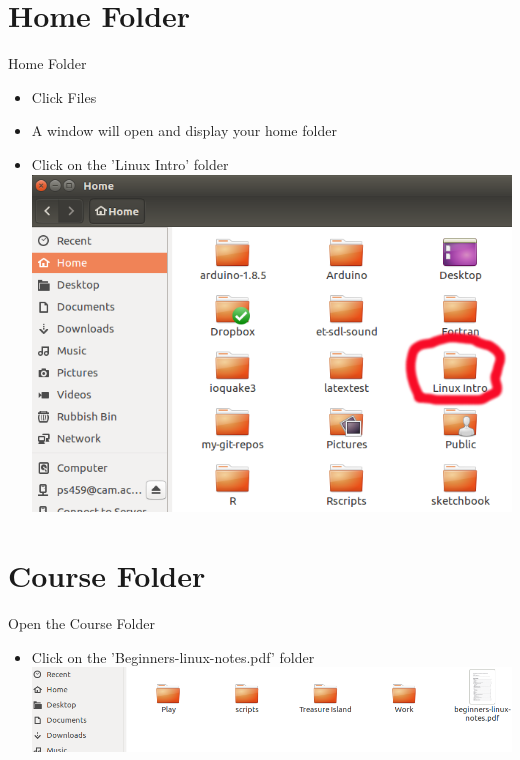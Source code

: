 \section{Home Folder}
\begin{frame}{Home Folder}
\begin{itemize}
\item Click Files
\item A window will open and display your home folder
\item Click on the 'Linux Intro' folder
\includegraphics[height=0.5\textheight]{imgs/HomeFolder.png}
\end{itemize}
\end{frame}

\section{Course Folder}
\begin{frame}{Open the Course Folder}
\begin{itemize}
\item Click on the 'Beginners-linux-notes.pdf' folder
\includegraphics[height=0.2\textheight]{imgs/LinuxIntroFolder.png}
\end{itemize}
\end{frame}

